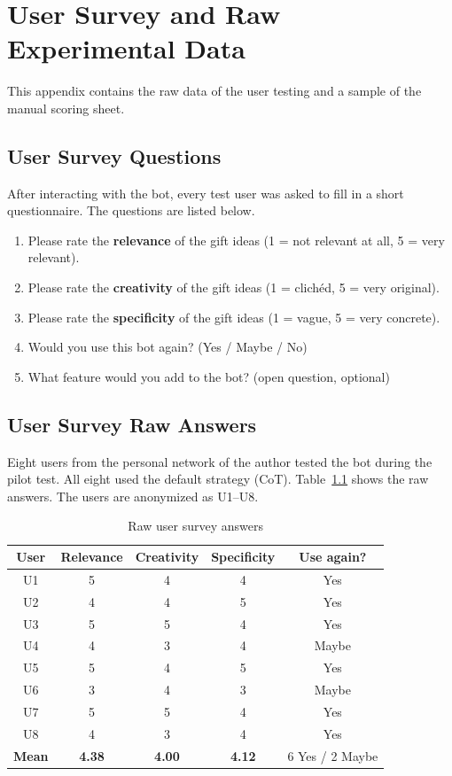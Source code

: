 \chapter{User Survey and Raw Experimental Data}
\label{app:survey}

This appendix contains the raw data of the user testing and a sample of the manual scoring sheet.

\section{User Survey Questions}

After interacting with the bot, every test user was asked to fill in a short questionnaire. The questions are listed below.

\begin{enumerate}
    \item Please rate the \textbf{relevance} of the gift ideas (1 = not relevant at all, 5 = very relevant).
    \item Please rate the \textbf{creativity} of the gift ideas (1 = clichéd, 5 = very original).
    \item Please rate the \textbf{specificity} of the gift ideas (1 = vague, 5 = very concrete).
    \item Would you use this bot again? (Yes / Maybe / No)
    \item What feature would you add to the bot? (open question, optional)
\end{enumerate}

\section{User Survey Raw Answers}

Eight users from the personal network of the author tested the bot during the pilot test. All eight used the default strategy (CoT). Table~\ref{tab:survey-raw} shows the raw answers. The users are anonymized as U1--U8.

\begin{table}[H]
\centering
\caption{Raw user survey answers}
\label{tab:survey-raw}
\begin{tabular}{ccccc}
\toprule
\textbf{User} & \textbf{Relevance} & \textbf{Creativity} & \textbf{Specificity} & \textbf{Use again?} \\
\midrule
U1 & 5 & 4 & 4 & Yes \\
U2 & 4 & 4 & 5 & Yes \\
U3 & 5 & 5 & 4 & Yes \\
U4 & 4 & 3 & 4 & Maybe \\
U5 & 5 & 4 & 5 & Yes \\
U6 & 3 & 4 & 3 & Maybe \\
U7 & 5 & 5 & 4 & Yes \\
U8 & 4 & 3 & 4 & Yes \\
\midrule
\textbf{Mean} & \textbf{4.38} & \textbf{4.00} & \textbf{4.12} & 6 Yes / 2 Maybe \\
\bottomrule
\end{tabular}
\end{table}

